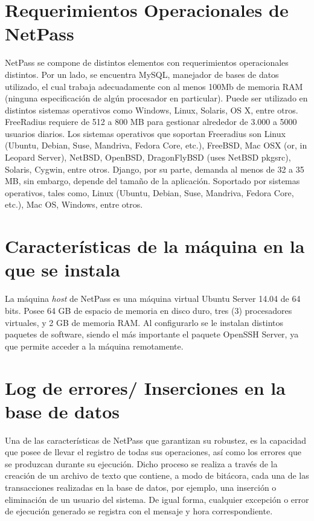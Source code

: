 \section{Requerimientos Operacionales de NetPass} \label{sect:Requerimientos Operacionales de NetPass}
		NetPass se compone de distintos elementos con requerimientos operacionales distintos. Por un lado, se encuentra MySQL, manejador de bases de datos utilizado, el cual trabaja adecuadamente con al menos 100Mb de memoria RAM (ninguna especificación de algún procesador en particular). Puede ser utilizado en distintos sistemas operativos como Windows, Linux, Solaris, OS X, entre otros. FreeRadius requiere de 512 a 800 MB para gestionar alrededor de 3.000 a 5000 usuarios diarios. Los sistemas operativos que soportan Freeradius son Linux (Ubuntu, Debian, Suse, Mandriva, Fedora Core, etc.), FreeBSD, Mac OSX (or, in Leopard Server), NetBSD, OpenBSD, DragonFlyBSD (uses NetBSD pkgsrc), Solaris, Cygwin, entre otros. Django, por su parte, demanda al menos de 32 a 35 MB, sin embargo, depende del tamaño de la aplicación. Soportado por sistemas operativos, tales como, Linux (Ubuntu, Debian, Suse, Mandriva, Fedora Core, etc.), Mac OS, Windows, entre otros.

\section{Características de la máquina en la que se instala} \label{sect:Caracteristicas de la maquina en la que se instala}
		La máquina \textit{host} de NetPass es una máquina virtual Ubuntu Server 14.04 de 64 bits. Posee 64 GB de espacio de memoria en disco duro, tres (3) procesadores virtuales, y 2 GB de memoria RAM. Al configurarlo se le instalan distintos paquetes de software, siendo el más importante el paquete OpenSSH Server, ya que permite acceder a la máquina remotamente.

		
\section{Log de errores/ Inserciones en la base de datos} \label{sect:Inserciones en la base de datos}
		Una de las características de NetPass que garantizan su robustez, es la capacidad que posee de llevar el registro de todas sus operaciones, así como los errores que se produzcan durante su ejecución. Dicho proceso se realiza a través de la creación de un archivo de texto que contiene, a modo de bitácora, cada una de las transacciones realizadas en la base de datos, por ejemplo, una inserción o eliminación de un usuario del sistema. De igual forma, cualquier excepción o error de ejecución generado se registra con el mensaje y hora correspondiente. 
		
